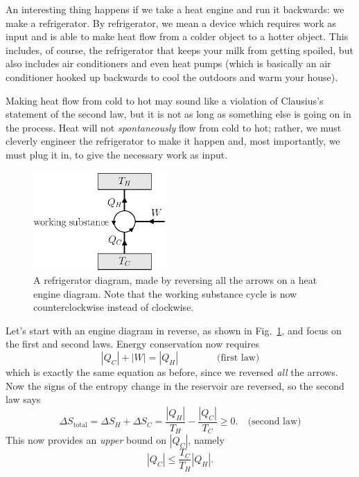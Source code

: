 An interesting thing happens if we take a heat engine and run it
backwards: we make a refrigerator.  By refrigerator, we mean a device
which requires work as input and is able to make heat flow from a
colder object to a hotter object.  This includes, of course, the
refrigerator that keeps your milk from getting spoiled, but also
includes air conditioners and even heat pumps (which is basically an
air conditioner hooked up backwards to cool the outdoors and warm
your house).

Making heat flow from cold to hot may sound like a violation of
Clausius's statement of the second law, but it is not as long as
something else is going on in the process.  Heat will not
{\it spontaneously\/} flow from cold to hot; rather, we must cleverly
engineer the refrigerator to make it happen and, most importantly, we
must plug it in, to give the necessary work as input.

\begin{figure}
\begin{center}
\includegraphics[width=2in]{heat_engines/refrigerator_diagram.eps}
\caption{A refrigerator diagram, made by reversing all the arrows on a
  heat engine diagram.  Note that the working substance cycle is now
  counterclockwise instead of clockwise.}
\label{fig:refrigerator_diagram}
\end{center}
\end{figure}

Let's start with an engine diagram in reverse, as shown in
Fig.~\ref{fig:refrigerator_diagram}, and focus on the first and second
laws.  Energy conservation now requires
\begin{equation}
|Q_C| + |W| = |Q_H| \qquad\qquad\text{(first law)}
\end{equation}
which is exactly the same equation as before, since we reversed {\it
  all\/} the arrows.  Now the signs of the entropy change in the
reservoir are reversed, so the second law says
\begin{equation}
\Delta S_\text{total} = \Delta S_H + \Delta S_C = 
 \frac{|Q_H|}{T_H} - \frac{|Q_C|}{T_C} \geq 0.\quad\text{(second law)}
\end{equation}
 This now provides an {\it upper\/} bound on $|Q_C|$, namely
\begin{equation}
|Q_C| \leq \frac{T_C}{T_H}|Q_H|.
\label{eq:qc_upper_bound}
\end{equation}

